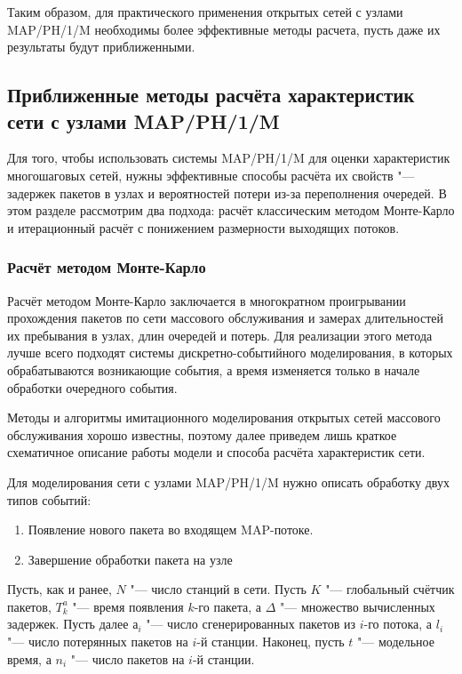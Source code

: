 Таким образом, для практического применения открытых сетей с узлами MAP/PH/1/M необходимы более эффективные методы расчета, пусть даже их результаты будут приближенными.




\subsection{Приближенные методы расчёта характеристик сети с узлами MAP/PH/1/M}

Для того, чтобы использовать системы MAP/PH/1/M для оценки характеристик многошаговых сетей, нужны эффективные способы расчёта их свойств "--- задержек пакетов в узлах и вероятностей потери из-за переполнения очередей. В этом разделе рассмотрим два подхода: расчёт классическим методом Монте-Карло и итерационный расчёт с понижением размерности выходящих потоков.


\subsubsection{Расчёт методом Монте-Карло}
Расчёт методом Монте-Карло заключается в многократном проигрывании прохождения пакетов по сети массового обслуживания и замерах длительностей их пребывания в узлах, длин очередей и потерь. Для реализации этого метода лучше всего подходят системы дискретно-событийного моделирования, в которых обрабатываются возникающие события, а время изменяется только в начале обработки очередного события. 

Методы и алгоритмы имитационного моделирования открытых сетей массового обслуживания хорошо известны, поэтому далее приведем лишь краткое схематичное описание работы модели и способа расчёта характеристик сети.

Для моделирования сети с узлами MAP/PH/1/M нужно описать обработку двух типов событий:

\begin{enumerate}
\item Появление нового пакета во входящем MAP-потоке.
\item Завершение обработки пакета на узле
\end{enumerate}

Пусть, как и ранее, $N$ "--- число станций в сети. Пусть $K$ "--- глобальный счётчик пакетов, $T_k^a$ "--- время появления $k$-го пакета, а $\Delta$ "--- множество вычисленных задержек. Пусть далее $а_i$ "--- число сгенерированных пакетов из $i$-го потока, а $l_i$ "--- число потерянных пакетов на $i$-й станции. Наконец, пусть $t$ "--- модельное время, а $n_i$ "--- число пакетов на $i$-й станции. 

